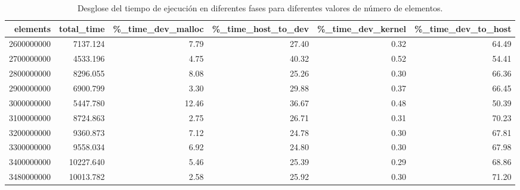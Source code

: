 \documentclass{article}
\begin{document}
			\begin{table}[H]
				\begin{adjustbox}{width=\textwidth, height=\textheight, keepaspectratio}
					\begin{tabular}{|r|r|r|r|r|r|}
						\hline
						elements & total\_time & \%\_time\_dev\_malloc & \%\_time\_host\_to\_dev & \%\_time\_dev\_kernel & \%\_time\_dev\_to\_host \\ \hline
						2600000000 & 7137.124 & 7.79 & 27.40 & 0.32 & 64.49 \\ \hline
						2700000000 & 4533.196 & 4.75 & 40.32 & 0.52 & 54.41 \\ \hline
						2800000000 & 8296.055 & 8.08 & 25.26 & 0.30 & 66.36 \\ \hline
						2900000000 & 6900.799 & 3.30 & 29.88 & 0.37 & 66.45 \\ \hline
						3000000000 & 5447.780 & 12.46 & 36.67 & 0.48 & 50.39 \\ \hline
						3100000000 & 8724.863 & 2.75 & 26.71 & 0.31 & 70.23 \\ \hline
						3200000000 & 9360.873 & 7.12 & 24.78 & 0.30 & 67.81 \\ \hline
						3300000000 & 9558.034 & 6.92 & 24.80 & 0.30 & 67.98 \\ \hline
						3400000000 & 10227.640 & 5.46 & 25.39 & 0.29 & 68.86 \\ \hline
						3480000000 & 10013.782 & 2.58 & 25.92 & 0.30 & 71.20 \\ \hline
					\end{tabular}
				\end{adjustbox}
				\caption{Desglose del tiempo de ejecución en diferentes fases para diferentes valores de número de elementos.}
				\label{tab:resultados4_2}
			\end{table}
\end{document}
